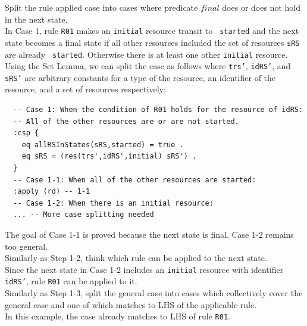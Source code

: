 \documentclass[12pt]{report}
\begin{document}
 Split the rule applied case into cases where
predicate $final$ does or does not hold in the next state.\\ In Case
1, rule {\tt R01} makes an {\tt initial} resource transit to {\tt
  started} and the next state becomes a final state if all other
resources included the set of resources {\tt sRS} are already {\tt
  started}. Otherwise there is at least one other {\tt initial}
resource.  Using the Set Lemma, we can split the case as follows where
{\tt trs'}, {\tt idRS'}, and {\tt sRS'} are arbitrary constants for a
type of the resource, an identifier of the resource, and a set of
resources respectively:
\begin{verbatim}
  -- Case 1: When the condition of R01 holds for the resource of idRS:
  -- All of the other resources are or are not started.
  :csp {
    eq allRSInStates(sRS,started) = true .
    eq sRS = (res(trs',idRS',initial) sRS') .
  }
  -- Case 1-1: When all of the other resources are started:
  :apply (rd) -- 1-1
  -- Case 1-2: When there is an initial resource:
  ... -- More case splitting needed
\end{verbatim}
The goal of Case 1-1 is proved because the next state is final.  Case
1-2 remains too general.\\

 Similarly as Step 1-2, think which rule can
be applied to the next state. \\ Since the next state in Case 1-2
includes an {\tt initial} resource with identifier {\tt idRS'}, rule
{\tt R01} can be applied to it.\\

 Similarly as Step 1-3, split the general case
into cases which collectively cover the general case and one of which
matches to LHS of the applicable rule. \\ In this example, the case
already matches to LHS of rule {\tt R01}.\\
\end{document}
